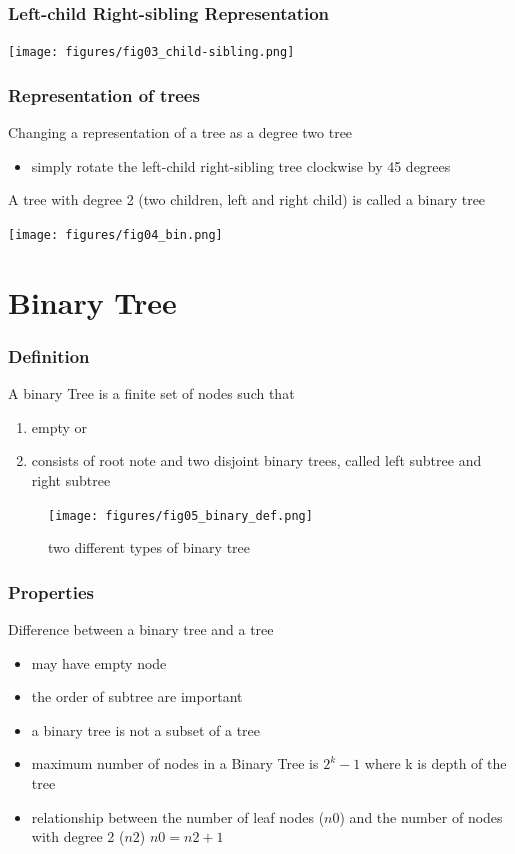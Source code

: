 \documentclass[newPxFont,sthlmFooter,nooffset]{beamer}
\begin{document}
\begin{frame}[t]
  \frametitle{Left-child Right-sibling Representation}
  \begin{center}
    \texttt{[image: figures/fig03\_child-sibling.png]}
  \end{center}

\end{frame}


\begin{frame}[t]
  \frametitle{Representation of trees}
Changing a representation of a tree as a degree two tree
\begin{itemize}
\item simply rotate the left-child right-sibling tree clockwise by 45 degrees
\end{itemize}

A tree with degree 2 (two children, left and right child) is called a binary tree

  \begin{center}
    \texttt{[image: figures/fig04\_bin.png]}
  \end{center}

\end{frame}

\section{Binary Tree}


\begin{frame}[t]
  \frametitle{Definition}
A binary Tree is a finite set of nodes such that
\begin{enumerate}
\item empty or
\item consists of root note and two disjoint binary trees, called left subtree and right subtree
\end{enumerate}


\begin{figure}
  \centering
  \texttt{[image: figures/fig05\_binary\_def.png]}
\caption{two different types of binary tree}
\end{figure}
\end{frame}


\begin{frame}[t]
  \frametitle{Properties}
Difference between a binary tree and a tree
\begin{itemize}
\item may have empty node
\item the order of subtree are important
\item a  binary tree is not a subset of a tree
\item maximum number of nodes in a Binary Tree is $2^k -1$ where k is
  depth of the tree
\item relationship between the number of leaf nodes ($n0$) and the
  number of nodes with degree 2 ($n2$) $ n0 =n2 +1$
\end{itemize}

\end{frame}
\end{document}
